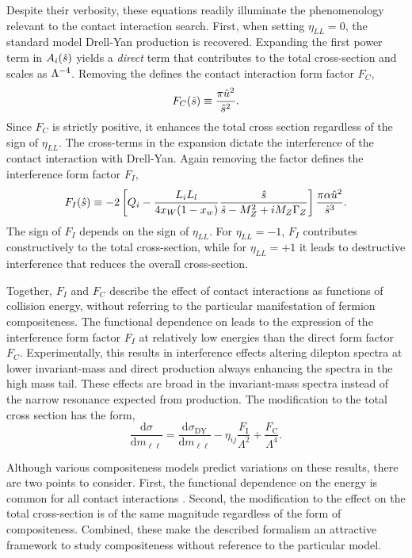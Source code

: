 Despite their verbosity, these equations readily illuminate the phenomenology relevant to the contact interaction search.
First, when setting $\eta_{LL}=0$, the standard model Drell-Yan production is recovered.
Expanding the first power term in $A_i(\hat{s})$ yields a \emph{direct} term that contributes to the total cross-section and scales as $\Lambda^{-4}$.
Removing the \lam defines the contact interaction form factor $F_C$,
\begin{equation}\begin{split}
    F_C(\hat{s}) \equiv \frac{\pi\hat{u}^2}{\hat{s}^2}.
\end{split}\end{equation} 
Since $F_C$ is strictly positive, it enhances the total \qqll cross section regardless of the sign of $\eta_{LL}$.
The cross-terms in the expansion dictate the interference of the contact interaction with Drell-Yan.
Again removing the \lam factor defines the interference form factor $F_I$,
\begin{equation}\begin{split}
    F_I(\hat{s}) \equiv -2\left[Q_i-\frac{L_iL_l}{4x_W(1-x_w)}\frac{\hat{s}}{\hat{s}-M_Z^2+iM_Z\Gamma_Z}\right]\frac{\pi\alpha\hat{u}^2}{\hat{s}^3}.
\end{split}\end{equation} 
The sign of $F_I$ depends on the sign of $\eta_{LL}$.
For $\eta_{LL}=-1$, $F_I$ contributes constructively to the total cross-section, while for $\eta_{LL}=+1$ it leads to destructive interference that reduces the overall cross-section.

Together, $F_I$ and $F_C$ describe the effect of contact interactions as functions of collision energy, without referring to the particular manifestation of fermion compositeness.
The functional dependence on \shat leads to the expression of the interference form factor $F_I$ at relatively low energies than the direct form factor $F_C$.
Experimentally, this results in interference effects altering dilepton spectra at lower invariant-mass and direct production always enhancing the spectra in the high mass tail.
These effects are broad in the invariant-mass spectra instead of the narrow resonance expected from \hmm production.
The modification to the total cross section has the form,
\begin{equation}\label{eqn:cixsPheno}
\frac{\text{d}\sigma}{\text{d}m_{\ell\ell}} = \frac{\text{d}\sigma_\textrm{DY}}{\text{d}m_{\ell\ell}} - \eta_{ij}\frac{F_\textrm{I}}{\Lambda^2} + \frac{F_\textrm{C}}{\Lambda^4}.
\end{equation}

Although various compositeness models predict variations on these results, there are two points to consider.
First, the functional dependence on the energy \shat is common for all contact interactions \cite{Eichten:1984eu}.
Second, the modification to the effect on the total cross-section is of the same magnitude regardless of the form of compositeness.
Combined, these make the described formalism an attractive framework to study compositeness without reference to the particular model.


